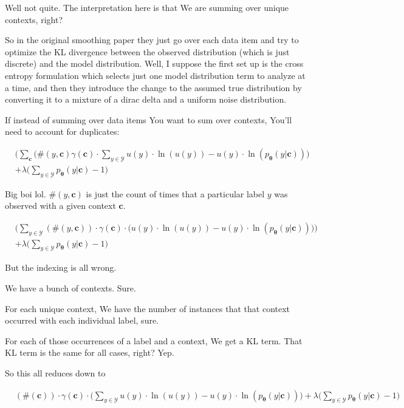\documentclass{article}
\newcommand{\vtheta}{\boldsymbol{\theta}}
\newcommand{\model}{p_{\vtheta}}
\newcommand{\context}{\boldsymbol{c}}
\begin{document}
			Well not quite. The interpretation here is that We are summing over unique contexts, right?
			
			So in the original smoothing paper they just go over each data item and try to optimize the KL divergence between the observed distribution (which is just discrete) and the model distribution. Well, I suppose the first set up is the cross entropy formulation which selects just one model distribution term to analyze at a time, and then they introduce the change to the assumed true distribution by converting it to a mixture of a dirac delta and a uniform noise distribution.
		
			If instead of summing over data items You want to sum over contexts, You'll need to account for duplicates:
			
			\begin{align}
				&\bigg(\sum_{\context} (\#(y, \context)\gamma(\context)\cdot\sum_{y\in\mathcal{Y}} u(y)\cdot\ln(u(y)) - u(y)\cdot\ln(\model(y|\context))\bigg) \\
			&+ \lambda\bigg(\sum_{y\in\mathcal{Y}} \model(y|\context) -1 \bigg)
			\end{align}
			
			Big boi lol. $\#(y, \context)$ is just the count of times that a particular label $y$ was observed with a given context $\context$.
			
			\begin{align}
				&\bigg(\sum_{y\in\mathcal{Y}} (\#(y, \context))\cdot \gamma(\context)\cdot \big( u(y)\cdot\ln(u(y)) - u(y)\cdot\ln(\model(y|\context))\big)\bigg) \\
			&+ \lambda\bigg(\sum_{y\in\mathcal{Y}} \model(y|\context) -1 \bigg)
			\end{align}
			
			But the indexing is all wrong.
			
			We have a bunch of contexts. Sure.
			
			For each unique context, We have the number of instances that that context occurred with each individual label, sure.
			
			For each of those occurrences of a label and a context, We get a KL term. That KL term is the same for all cases, right? Yep.
			
			So this all reduces down to
			
			\begin{align}
				&(\#(\context))\cdot \gamma(\context)\cdot \bigg( \sum_{y\in\mathcal{Y}} u(y)\cdot\ln(u(y)) - u(y)\cdot\ln(\model(y|\context))\bigg) + \lambda\bigg(\sum_{y\in\mathcal{Y}} \model(y|\context) -1 \bigg)
			\end{align}
			
\end{document}
